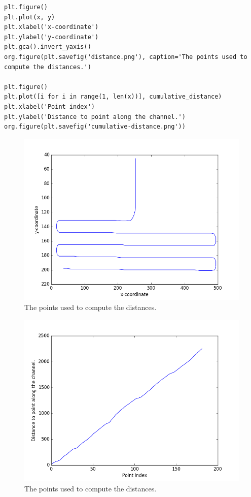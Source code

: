 \documentclass[11pt]{article}
\begin{document}
\begin{verbatim}
plt.figure()
plt.plot(x, y)
plt.xlabel('x-coordinate')
plt.ylabel('y-coordinate')
plt.gca().invert_yaxis()
org.figure(plt.savefig('distance.png'), caption='The points used to compute the distances.')

plt.figure()
plt.plot([i for i in range(1, len(x))], cumulative_distance)
plt.xlabel('Point index')
plt.ylabel('Distance to point along the channel.')
org.figure(plt.savefig('cumulative-distance.png'))
\end{verbatim}
\begin{figure}[htb]
\centering
\includegraphics[width=.9\linewidth]{distance.png}
\caption{The points used to compute the distances.}
\end{figure}
\begin{figure}[htb]
\centering
\includegraphics[width=.9\linewidth]{cumulative-distance.png}
\caption{The points used to compute the distances.}
\end{figure}
\end{document}
